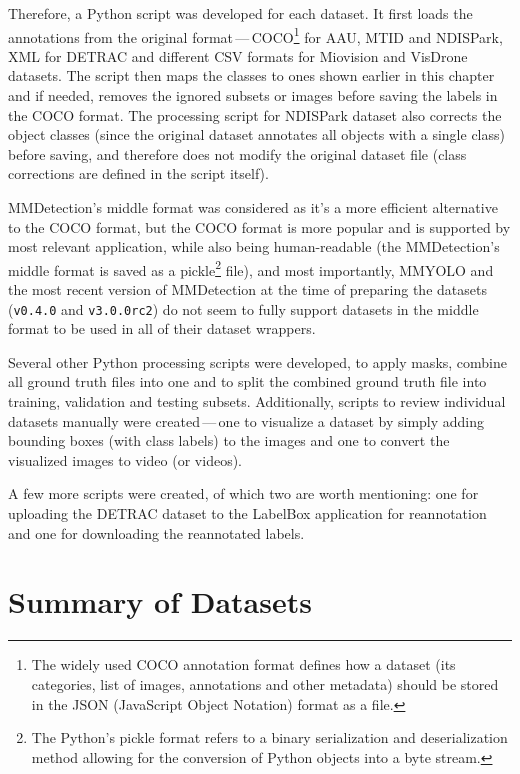 Therefore, a Python script was developed for each dataset. It first loads the
annotations from the original format\,---\,COCO\footnote{The widely used COCO
annotation format defines how a dataset (its categories, list of images,
annotations and other metadata) should be stored in the JSON (JavaScript Object
Notation) format as a file.} for AAU, MTID
and NDISPark, XML for DETRAC and different CSV formats for Miovision and VisDrone datasets.
The script then maps the classes to ones shown earlier in this chapter and if
needed, removes the ignored subsets or images before saving the labels in the
COCO format. The processing script for NDISPark dataset also corrects the object
classes (since the original dataset annotates all objects with a single class)
before saving, and therefore does not modify the original dataset file (class
corrections are defined in the script itself).

MMDetection's middle format was considered as it's a more efficient alternative
to the COCO format, but the COCO format is more popular and is supported by most
relevant application, while also being human-readable (the MMDetection's middle
format is saved as a pickle\footnote{The Python's pickle format refers to a
binary serialization and deserialization method allowing for the conversion of
Python objects into a byte stream.} file), and most importantly, MMYOLO and the
most recent version of MMDetection at the time of preparing the datasets
(\texttt{v0.4.0} and \texttt{v3.0.0rc2}) do not seem to fully support datasets
in the middle format to be used in all of their dataset wrappers.

Several other Python processing scripts were developed, to apply masks, combine
all ground truth files into one and to split the combined ground truth file into
training, validation and testing subsets. Additionally, scripts to review
individual datasets manually were created\,---\,one to visualize a dataset by simply
adding bounding boxes (with class labels) to the images and one to convert the
visualized images to video (or videos).

A few more scripts were created, of which two are worth mentioning: one for
uploading the DETRAC dataset to the LabelBox application for reannotation and
one for downloading the reannotated labels.


\section{Summary of Datasets}

